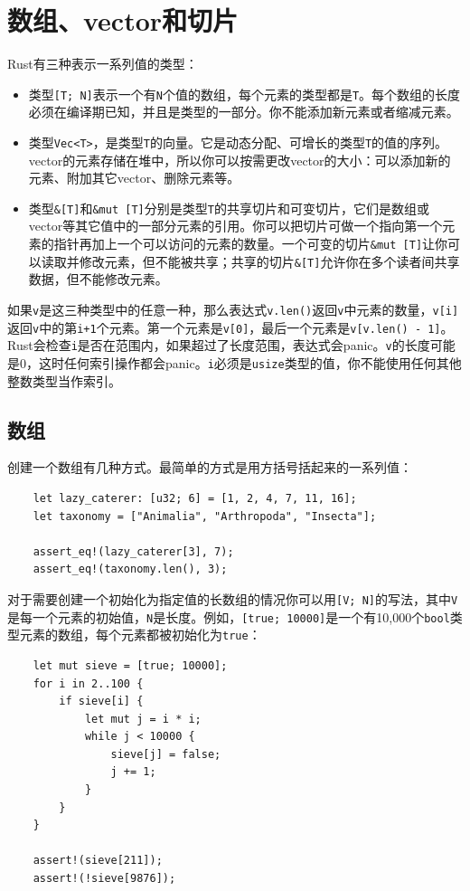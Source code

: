 \section{数组、vector和切片}
Rust有三种表示一系列值的类型：
\begin{itemize}
    \item 类型\texttt{[T; N]}表示一个有\texttt{N}个值的数组，每个元素的类型都是\texttt{T}。每个数组的长度必须在编译期已知，并且是类型的一部分。你不能添加新元素或者缩减元素。
    \item 类型\texttt{Vec<T>}，是类型\texttt{T}的向量。它是动态分配、可增长的类型\texttt{T}的值的序列。vector的元素存储在堆中，所以你可以按需更改vector的大小：可以添加新的元素、附加其它vector、删除元素等。
    \item 类型\texttt{\&[T]}和\texttt{\&mut [T]}分别是类型\texttt{T}的共享切片和可变切片，它们是数组或vector等其它值中的一部分元素的引用。你可以把切片可做一个指向第一个元素的指针再加上一个可以访问的元素的数量。一个可变的切片\texttt{\&mut [T]}让你可以读取并修改元素，但不能被共享；共享的切片\texttt{\&[T]}允许你在多个读者间共享数据，但不能修改元素。
\end{itemize}

如果\texttt{v}是这三种类型中的任意一种，那么表达式\texttt{v.len()}返回\texttt{v}中元素的数量，\texttt{v[i]}返回\texttt{v}中的第\texttt{i+1}个元素。第一个元素是\texttt{v[0]}，最后一个元素是\texttt{v[v.len() - 1]}。Rust会检查\texttt{i}是否在范围内，如果超过了长度范围，表达式会panic。\texttt{v}的长度可能是0，这时任何索引操作都会panic。\texttt{i}必须是\texttt{usize}类型的值，你不能使用任何其他整数类型当作索引。

\subsection{数组}
创建一个数组有几种方式。最简单的方式是用方括号括起来的一系列值：
\begin{verbatim}
    let lazy_caterer: [u32; 6] = [1, 2, 4, 7, 11, 16];
    let taxonomy = ["Animalia", "Arthropoda", "Insecta"];

    assert_eq!(lazy_caterer[3], 7);
    assert_eq!(taxonomy.len(), 3);
\end{verbatim}

对于需要创建一个初始化为指定值的长数组的情况你可以用\texttt{[V; N]}的写法，其中\texttt{V}是每一个元素的初始值，\texttt{N}是长度。例如，\texttt{[true; 10000]}是一个有10,000个\texttt{bool}类型元素的数组，每个元素都被初始化为\texttt{true}：
\begin{verbatim}
    let mut sieve = [true; 10000];
    for i in 2..100 {
        if sieve[i] {
            let mut j = i * i;
            while j < 10000 {
                sieve[j] = false;
                j += 1;
            }
        }
    }

    assert!(sieve[211]);
    assert!(!sieve[9876]);
\end{verbatim}

